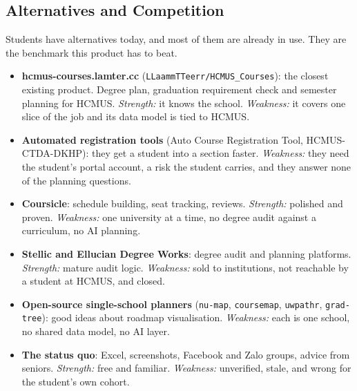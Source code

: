 \documentclass{article}
\begin{document}
\subsection{Alternatives and Competition}
Students have alternatives today, and most of them are already in use. They are the benchmark this product has to beat.

\begin{itemize}
  \item \textbf{hcmus-courses.lamter.cc} (\texttt{LLaammTTeerr/HCMUS\_Courses}): the closest existing product. Degree plan,
        graduation requirement check and semester planning for HCMUS. \emph{Strength:} it knows the school.
        \emph{Weakness:} it covers one slice of the job and its data model is tied to HCMUS.
  \item \textbf{Automated registration tools} (Auto Course Registration Tool, HCMUS-CTDA-DKHP): they get a student into a
        section faster. \emph{Weakness:} they need the student's portal account, a risk the student carries, and they
        answer none of the planning questions.
  \item \textbf{Coursicle}: schedule building, seat tracking, reviews. \emph{Strength:} polished and proven.
        \emph{Weakness:} one university at a time, no degree audit against a curriculum, no AI planning.
  \item \textbf{Stellic and Ellucian Degree Works}: degree audit and planning platforms. \emph{Strength:} mature audit
        logic. \emph{Weakness:} sold to institutions, not reachable by a student at HCMUS, and closed.
  \item \textbf{Open-source single-school planners} (\texttt{nu-map}, \texttt{coursemap}, \texttt{uwpathr},
        \texttt{grad-tree}): good ideas about roadmap visualisation. \emph{Weakness:} each is one school, no shared data
        model, no AI layer.
  \item \textbf{The status quo}: Excel, screenshots, Facebook and Zalo groups, advice from seniors. \emph{Strength:} free
        and familiar. \emph{Weakness:} unverified, stale, and wrong for the student's own cohort.
\end{itemize}
\end{document}
